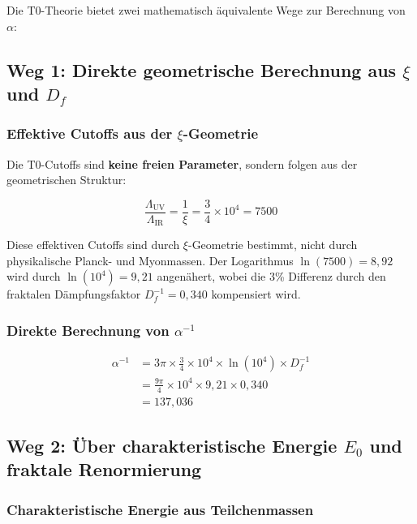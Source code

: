 \documentclass[12pt,a4paper]{article}
\theoremstyle{definition}
\begin{document}
	Die T0-Theorie bietet zwei mathematisch äquivalente Wege zur Berechnung von $\alpha$:
	
	\subsection{Weg 1: Direkte geometrische Berechnung aus $\xi$ und $D_f$}
	
	\subsubsection{Effektive Cutoffs aus der $\xi$-Geometrie}
	
	Die T0-Cutoffs sind \textbf{keine freien Parameter}, sondern folgen aus der geometrischen Struktur:
	
	\begin{equation}
		\frac{\Lambda_{\text{UV}}}{\Lambda_{\text{IR}}} = \frac{1}{\xi} = \frac{3}{4} \times 10^4 = 7500
	\end{equation}
	
	Diese effektiven Cutoffs sind durch $\xi$-Geometrie bestimmt, nicht durch physikalische Planck- und Myonmassen. Der Logarithmus $\ln(7500) = 8{,}92$ wird durch $\ln(10^4) = 9{,}21$ angenähert, wobei die 3\% Differenz durch den fraktalen Dämpfungsfaktor $D_f^{-1} = 0{,}340$ kompensiert wird.
	
	\subsubsection{Direkte Berechnung von $\alpha^{-1}$}
	
	\begin{align}
		\alpha^{-1} &= 3\pi \times \frac{3}{4} \times 10^4 \times \ln(10^4) \times D_f^{-1} \\
		&= \frac{9\pi}{4} \times 10^4 \times 9{,}21 \times 0{,}340 \\
		&= 137{,}036
	\end{align}
	
	\subsection{Weg 2: Über charakteristische Energie $E_0$ und fraktale Renormierung}
	
	\subsubsection{Charakteristische Energie aus Teilchenmassen}
	
\end{document}
